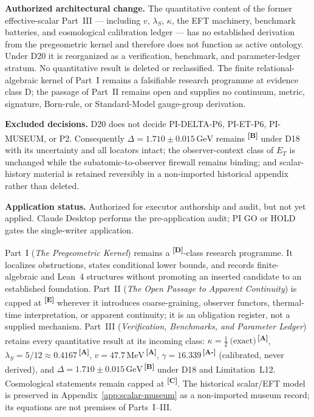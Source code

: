 \documentclass[12pt,a4paper,twoside]{article}
\theoremstyle{plain}
\theoremstyle{definition}
\theoremstyle{remark}
\newcommand{\GeV}{\,\mathrm{GeV}}
\newcommand{\MeV}{\,\mathrm{MeV}}
\newcommand{\catmark}[1]{\textsuperscript{\textsf{\textbf{[#1]}}}}
\newcommand{\lambdaS}{5/12 \approx 0.4167} %
\newcommand{\DeltaGap}{1.710 \pm 0.015\GeV} %
\newcommand{\GammaGeom}{16.339} %
\newcommand{\vVEV}{47.7\MeV} %
\newcommand{\KappaRG}{\tfrac{1}{2}\ \text{(exact)}} %
\begin{document}
\begin{pioverridebox}
\label{box:pi-decision-d20}
\textbf{Authorized architectural change.} The quantitative content of the
former effective-scalar Part~III --- including $v$, $\lambda_S$, $\kappa$,
the EFT machinery, benchmark batteries, and cosmological calibration ledger
--- has no established derivation from the pregeometric kernel and therefore
does not function as active ontology. Under D20 it is reorganized as a
verification, benchmark, and parameter-ledger stratum. No quantitative result
is deleted or reclassified. The finite relational-algebraic kernel of Part~I
remains a falsifiable research programme at evidence class D; the passage of
Part~II remains open and supplies no continuum, metric, signature, Born-rule,
or Standard-Model gauge-group derivation.

\textbf{Excluded decisions.} D20 does not decide PI-DELTA-P6,
PI-ET-P6, PI-MUSEUM, or P2. Consequently $\Delta=\DeltaGap$ remains
\catmark{B} under D18 with its uncertainty and all locators intact; the
observer-context class of $E_T$ is unchanged while the subatomic-to-observer
firewall remains binding; and scalar-history material is retained reversibly
in a non-imported historical appendix rather than deleted.

\textbf{Application status.} Authorized for executor authorship and audit,
but not yet applied. Claude Desktop performs the pre-application audit; PI GO
or HOLD gates the single-writer application.
\end{pioverridebox}

\begin{evidencebox}{}
Part~I (\emph{The Pregeometric Kernel}) remains a \catmark{D}-class research
programme. It localizes obstructions, states conditional lower bounds, and
records finite-algebraic and Lean~4 structures without promoting an inserted
candidate to an established foundation. Part~II (\emph{The Open Passage to
Apparent Continuity}) is capped at \catmark{E} wherever it introduces
coarse-graining, observer functors, thermal-time interpretation, or apparent
continuity; it is an obligation register, not a supplied mechanism. Part~III
(\emph{Verification, Benchmarks, and Parameter Ledger}) retains every
quantitative result at its incoming class: $\kappa=\KappaRG$\,\catmark{A},
$\lambda_S=\lambdaS$\,\catmark{A}, $v=\vVEV$\,\catmark{A},
$\gamma=\GammaGeom$\,\catmark{A-} (calibrated, never derived), and
$\Delta=\DeltaGap$\,\catmark{B} under D18 and Limitation~L12. Cosmological
statements remain capped at \catmark{C}. The historical scalar/EFT model is
preserved in Appendix~\ref{app:scalar-museum} as a non-imported museum record;
its equations are not premises of Parts~I--III.
\end{evidencebox}
\end{document}
